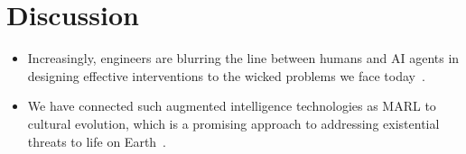 \documentclass[letterpaper,11.5pt]{scrartcl}
\begin{document}







\section{Discussion}

\begin{itemize}
  \item 
    Increasingly, engineers are blurring the line between humans and AI agents in designing
    effective interventions to the wicked problems we face
    today~\cite{Irrgang2021,Rolnick2022}.
  \item
    We have connected such augmented intelligence technologies as MARL to
    cultural evolution, which is a promising approach to addressing existential
    threats to life on Earth~\cite{Jones2021}.
\end{itemize}





\end{document}
